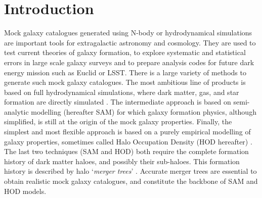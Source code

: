 \section{Introduction}

Mock galaxy catalogues generated using N-body or hydrodynamical
simulations are important tools for extragalactic astronomy and
cosmology.  They are used to test current theories of galaxy
formation, to explore systematic and statistical errors in large scale
galaxy surveys and to prepare analysis codes for future dark energy
mission such as Euclid or LSST.  There is a large variety of methods
to generate such mock galaxy catalogues.  The most ambitious line of
products is based on full hydrodynamical simulations, where dark
matter, gas, and star formation are directly simulated
\citep{duboisDancingDarkGalactic2014,
  khandaiMassiveBlackIISimulationEvolution2015,
  vogelsbergerPropertiesGalaxiesReproduced2014,
  schayeEAGLEProjectSimulating2015}.  The intermediate approach is
based on semi-analytic modelling (hereafter SAM) \citep{SA-white,
  SA-durham, SA-Somerville, SA-Kaufmann,
  kangSemianalyticalModelGalaxy2005,crotonManyLivesActive2006,somervilleSemianalyticModelCoevolution2008,
  guoDwarfSpheroidalsCD2011, luAlgorithmsRadiativeCooling2011} for
which galaxy formation physics, although simplified, is still at the
origin of the mock galaxy properties. Finally, the simplest and most
flexible approach is based on a purely empirical modelling of galaxy
properties, sometimes called Halo Occupation Density (HOD hereafter)
\citep[e.g.][]{HOD-Seljak, HOD-Berlind,
  peacockHaloOccupationNumbers2000,
  bensonNatureGalaxyBias2000,wechslerGalaxyFormationConstraints2001,scoccimarroHowManyGalaxies2001,bullockGalaxyHaloOccupation2002,
  CLF,
  yangConstrainingGalaxyFormation2003,yangEvolutionGalaxyDarkMatter2012,valeLinkingHaloMass2004,vandenboschLinkingEarlyLatetype2003,CSMF,
  SHAM-Kravtsov, SHAM-Vale-Ostriker,
  conroyModelingLuminositydependentGalaxy2006a, Behroozi, Moster,
  guoHowGalaxiesPopulate2010, yamamotoTestingSubhaloAbundance2015,
  nuzaClusteringGalaxiesSDSSIII2013}.  The last two techniques (SAM
and HOD) both require the complete formation history of dark matter
haloes, and possibly their sub-haloes. This formation history is
described by halo `\emph{merger trees}'
\citep{roukemaSpectralEvolutionMerging1993,
  roukemaFailureSimpleMerging1993, laceyMergerRatesHierarchical1993}.
Accurate merger trees are essential to obtain realistic mock galaxy
catalogues, and constitute the backbone of SAM and HOD models.


